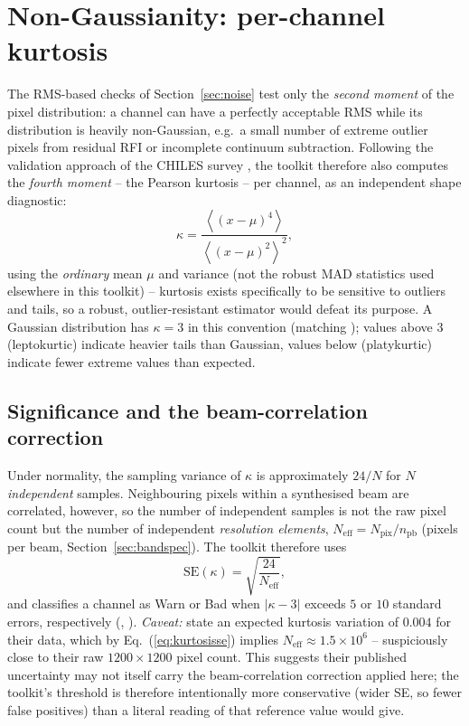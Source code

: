 \documentclass[11pt,a4paper]{article}
\begin{document}
\section{Non-Gaussianity: per-channel kurtosis}\label{sec:kurtosis}
The RMS-based checks of Section~\ref{sec:noise} test only the \emph{second
moment} of the pixel distribution: a channel can have a perfectly acceptable
RMS while its distribution is heavily non-Gaussian, e.g.\ a small number of
extreme outlier pixels from residual RFI or incomplete continuum subtraction.
Following the validation approach of the CHILES survey \citep{luber2025}, the
toolkit therefore also computes the \emph{fourth moment} -- the Pearson
kurtosis -- per channel, as an independent shape diagnostic:
\begin{equation}
  \kappa = \frac{\left\langle (x-\mu)^4\right\rangle}{\left\langle (x-\mu)^2\right\rangle^2},
  \label{eq:kurtosis}
\end{equation}
using the \emph{ordinary} mean $\mu$ and variance (not the robust MAD
statistics used elsewhere in this toolkit) -- kurtosis exists specifically to
be sensitive to outliers and tails, so a robust, outlier-resistant estimator
would defeat its purpose. A Gaussian distribution has $\kappa = 3$ in this
convention (matching \citealt{luber2025}); values above $3$ (leptokurtic)
indicate heavier tails than Gaussian, values below (platykurtic) indicate
fewer extreme values than expected.

\subsection{Significance and the beam-correlation correction}
Under normality, the sampling variance of $\kappa$ is approximately $24/N$ for
$N$ \emph{independent} samples. Neighbouring pixels within a synthesised beam
are correlated, however, so the number of independent samples is not the raw
pixel count but the number of independent \emph{resolution elements},
$N_{\mathrm{eff}} = N_{\mathrm{pix}}/n_{\mathrm{pb}}$ (pixels per beam,
Section~\ref{sec:bandspec}). The toolkit therefore uses
\begin{equation}
  \mathrm{SE}(\kappa) = \sqrt{\frac{24}{N_{\mathrm{eff}}}},
  \label{eq:kurtosisse}
\end{equation}
and classifies a channel as \textsf{Warn} or \textsf{Bad} when $|\kappa - 3|$
exceeds $5$ or $10$ standard errors, respectively
(,
).
\emph{Caveat:} \citet{luber2025} state an
expected kurtosis variation of $0.004$ for their data, which by
Eq.~(\ref{eq:kurtosisse}) implies $N_{\mathrm{eff}} \approx 1.5\times10^6$ --
suspiciously close to their raw $1200\times1200$ pixel count. This suggests
their published uncertainty may not itself carry the beam-correlation
correction applied here; the toolkit's threshold is therefore intentionally
more conservative (wider SE, so fewer false positives) than a literal reading
of that reference value would give.
\end{document}
